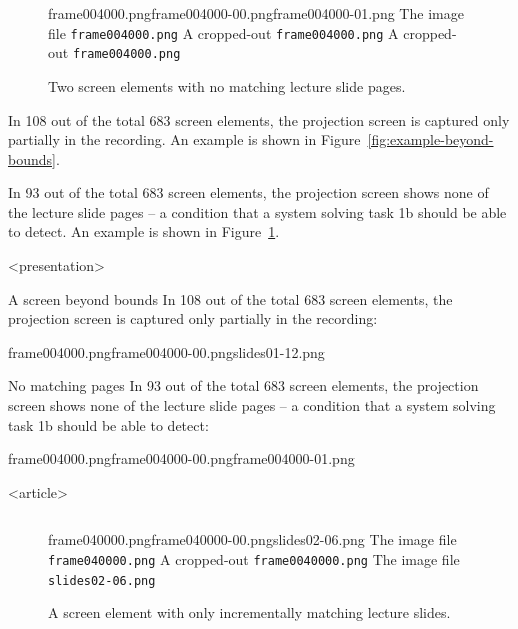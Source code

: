 \begin{description}
\begin{figure}
    \kern\floatsep
    \inputminted{xml}{fig/examples/no-keyrefs/example.xml}\par
      {frame004000.png}{frame004000-00.png}{frame004000-01.png}%
      {The image file \texttt{frame004000.png}}%
      {A cropped-out \texttt{frame004000.png}}%
      {A cropped-out \texttt{frame004000.png}}
    \caption{Two screen elements with no matching lecture slide pages.}
    \label{fig:example-no-keyrefs}
  \end{figure}
  \item[A screen beyond bounds] In 108 out of the total 683 screen elements,
    the projection screen is captured only partially in the recording.
    An example is shown in Figure~\ref{fig:example-beyond-bounds}.
  \item[No matching pages] In 93 out of the total 683 screen elements, the
    projection screen shows none of the lecture slide pages – a condition
    that a system solving task 1b should be able to detect.
    An example is shown in Figure~\ref{fig:example-no-keyrefs}.

\mode
<presentation>

  \begin{frame}{A screen beyond bounds}
    In 108 out of the total 683 screen elements, the projection screen is
    captured only partially in the recording:

      {frame004000.png}{frame004000-00.png}{slides01-12.png}%
  \end{frame}
  \begin{frame}{No matching pages}
    In 93 out of the total 683 screen elements, the projection screen shows
    none of the lecture slide pages – a condition that a system solving task 1b
    should be able to detect:

      {frame004000.png}{frame004000-00.png}{frame004000-01.png}%
  \end{frame}

\mode
<article>

  \begin{figure}
    \inputminted{xml}{fig/examples/incremental-only/example.xml}\par
      {frame040000.png}{frame040000-00.png}{slides02-06.png}%
      {The image file \texttt{frame040000.png}}%
      {A cropped-out \texttt{frame0040000.png}}%
      {The image file \texttt{slides02-06.png}}
    \caption{A screen element with only incrementally matching lecture slides.}
    \label{fig:example-incremental-only}


\end{figure}
\end{description}
